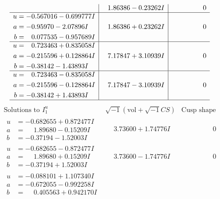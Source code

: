 \documentclass[1p]{elsarticle_modified}
\theoremstyle{definition}
\newcommand{\I}{\sqrt{-1}}
\begin{document}
$$\begin{array}{c|c|c}
 & \phantom{-}1.86386 - 0.23262 I & \phantom{-0.000000 } 0 \\ \hline\begin{aligned}
u &= -0.567016 - 0.699777 I \\
a &= -0.95970 - 2.07896 I \\
b &= \phantom{-}0.077535 - 0.957689 I\end{aligned}
 & \phantom{-}1.86386 + 0.23262 I & \phantom{-0.000000 } 0 \\ \hline\begin{aligned}
u &= \phantom{-}0.723463 + 0.835058 I \\
a &= -0.215596 + 0.128864 I \\
b &= -0.38142 - 1.43893 I\end{aligned}
 & \phantom{-}7.17847 + 3.10939 I & \phantom{-0.000000 } 0 \\ \hline\begin{aligned}
u &= \phantom{-}0.723463 - 0.835058 I \\
a &= -0.215596 - 0.128864 I \\
b &= -0.38142 + 1.43893 I\end{aligned}
 & \phantom{-}7.17847 - 3.10939 I & \phantom{-0.000000 } 0\\
 \hline 
 \end{array}$$\newpage$$\begin{array}{c|c|c}  
\text{Solutions to }I^u_{1}& \I (\text{vol} + \sqrt{-1}CS) & \text{Cusp shape}\\
 \hline 
\begin{aligned}
u &= -0.682655 + 0.872477 I \\
a &= \phantom{-}1.89680 - 0.15209 I \\
b &= -0.37194 - 1.52003 I\end{aligned}
 & \phantom{-}3.73600 + 1.74776 I & \phantom{-0.000000 } 0 \\ \hline\begin{aligned}
u &= -0.682655 - 0.872477 I \\
a &= \phantom{-}1.89680 + 0.15209 I \\
b &= -0.37194 + 1.52003 I\end{aligned}
 & \phantom{-}3.73600 - 1.74776 I & \phantom{-0.000000 } 0 \\ \hline\begin{aligned}
u &= -0.088101 + 1.107340 I \\
a &= -0.672055 - 0.992258 I \\
b &= \phantom{-}0.405563 + 0.942170 I\end{aligned}

\end{array}$$
\end{document}
